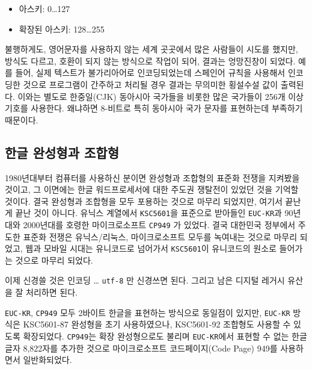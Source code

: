 \documentclass[
  letterpaper,
]{book}
\providecommand{\tightlist}{%
  \setlength{\itemsep}{0pt}\setlength{\parskip}{0pt}}\usepackage{longtable,booktabs,array}
\begin{document}
\begin{itemize}
\tightlist
\item
  아스키: 0\ldots127
\item
  확장된 아스키: 128\ldots255
\end{itemize}

불행하게도, 영어문자를 사용하지 않는 세계 곳곳에서 많은 사람들이 시도를
했지만, 방식도 다르고, 호환이 되지 않는 방식으로 작업이 되어, 결과는
엉망진창이 되었다. 예를 들어, 실제 텍스트가 불가리아어로 인코딩되었는데
스페인어 규칙을 사용해서 인코딩한 것으로 프로그램이 간주하고 처리될 경우
결과는 무의미한 횡설수설 값이 출력된다. 이와는 별도로 한중일(CJK)
동아시아 국가들을 비롯한 많은 국가들이 256개 이상 기호를 사용한다.
왜냐하면 8-비트로 특히 동아시아 국가 문자를 표현하는데 부족하기
때문이다.

\hypertarget{uxd55cuxae00-uxc644uxc131uxd615uxacfc-uxc870uxd569uxd615}{%
\subsection{한글 완성형과
조합형}\label{uxd55cuxae00-uxc644uxc131uxd615uxacfc-uxc870uxd569uxd615}}

1980년대부터 컴퓨터를 사용하신 분이면 완성형과 조합형의 표준화 전쟁을
지켜봤을 것이고, 그 이면에는 한글 워드프로세서에 대한 주도권 쟁탈전이
있었던 것을 기억할 것이다. 결국 완성형과 조합형을 모두 포용하는 것으로
마무리 되었지만, 여기서 끝난게 끝난 것이 아니다. 유닉스 계열에서
\texttt{KSC5601}을 표준으로 받아들인 \texttt{EUC-KR}과 90년대와
2000년대를 호령한 마이크로소프트 \texttt{CP949} 가 있었다. 결국 대한민국
정부에서 주도한 표준화 전쟁은 유닉스/리눅스, 마이크로소프트 모두를
녹여내는 것으로 마무리 되었고, 웹과 모바일 시대는 유니코드로 넘어가서
\texttt{KSC5601}이 유니코드의 원소로 들어가는 것으로 마무리 되었다.

이제 신경쓸 것은 인코딩 \ldots{} \texttt{utf-8} 만 신경쓰면 된다. 그리고
남은 디지털 레거시 유산을 잘 처리하면 된다.

\begin{tcolorbox}[enhanced jigsaw, opacityback=0, opacitybacktitle=0.6, colback=white, rightrule=.15mm, coltitle=black, colframe=quarto-callout-note-color-frame, colbacktitle=quarto-callout-note-color!10!white, bottomrule=.15mm, bottomtitle=1mm, breakable, title=\textcolor{quarto-callout-note-color}{\faInfo}\hspace{0.5em}{유닉스/리눅스(EUC-KR), 윈도우(CP949)}, titlerule=0mm, leftrule=.75mm, toptitle=1mm, left=2mm, arc=.35mm, toprule=.15mm]

\texttt{EUC-KR}, \texttt{CP949} 모두 2바이트 한글을 표현하는 방식으로
동일점이 있지만, \texttt{EUC-KR} 방식은 KSC5601-87 완성형을 초기
사용하였으나, KSC5601-92 조합형도 사용할 수 있도록 확장되었다.
\texttt{CP949}는 확장 완성형으로도 불리며 \texttt{EUC-KR}에서 표현할 수
없는 한글글자 8,822자를 추가한 것으로 마이크로소프트 코드페이지(Code
Page) 949를 사용하면서 일반화되었다.

\end{tcolorbox}
\end{document}
